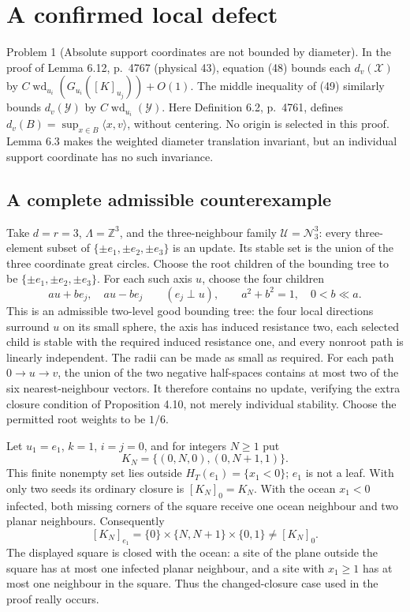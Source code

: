 \documentclass[10pt]{article}
\begin{document}
\section*{A confirmed local defect}
Problem 1 (Absolute support coordinates are not bounded by diameter).  In the proof of Lemma 6.12, p. 4767 (physical 43), equation (48) bounds each \(d_v(\mathcal X)\) by \(C\operatorname{wd}_{u_i}(G_{u_i}([K]_{u_j}))+O(1)\). The middle inequality of (49) similarly bounds \(d_v(\mathcal Y)\) by \(C\operatorname{wd}_{u_i}(\mathcal Y)\). Here Definition 6.2, p. 4761, defines \(d_v(B)=\sup_{x\in B}\langle x,v\rangle\), without centering. No origin is selected in this proof. Lemma 6.3 makes the weighted diameter translation invariant, but an individual support coordinate has no such invariance.\par
\subsection*{A complete admissible counterexample}
Take \(d=r=3\), \(\Lambda=\mathbb Z^3\), and the three-neighbour family \(\mathcal U=\mathcal N_3^3\): every three-element subset of \(\{\pm e_1,\pm e_2,\pm e_3\}\) is an update. Its stable set is the union of the three coordinate great circles. Choose the root children of the bounding tree to be \(\{\pm e_1,\pm e_2,\pm e_3\}\). For each such axis \(u\), choose the four children \[au+be_j,\quad au-be_j\qquad(e_j\perp u),\qquad
 a^2+b^2=1,\quad 0<b\ll a.\] This is an admissible two-level good bounding tree: the four local directions surround \(u\) on its small sphere, the axis has induced resistance two, each selected child is stable with the required induced resistance one, and every nonroot path is linearly independent. The radii can be made as small as required. For each path \(0\to u\to v\), the union of the two negative half-spaces contains at most two of the six nearest-neighbour vectors. It therefore contains no update, verifying the extra closure condition of Proposition 4.10, not merely individual stability. Choose the permitted root weights to be \(1/6\).\par
Let \(u_1=e_1\), \(k=1\), \(i=j=0\), and for integers \(N\ge1\) put \[K_N=\{(0,N,0),(0,N+1,1)\}.\] This finite nonempty set lies outside \(H_T(e_1)=\{x_1<0\}\); \(e_1\) is not a leaf. With only two seeds its ordinary closure is \([K_N]_0=K_N\). With the ocean \(x_1<0\) infected, both missing corners of the square receive one ocean neighbour and two planar neighbours. Consequently \[[K_N]_{e_1}=\{0\}\times\{N,N+1\}\times\{0,1\}\ne[K_N]_0.\] The displayed square is closed with the ocean: a site of the plane outside the square has at most one infected planar neighbour, and a site with \(x_1\ge1\) has at most one neighbour in the square. Thus the changed-closure case used in the proof really occurs.\par
\end{document}
